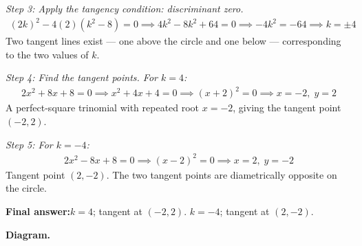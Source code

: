 \documentclass[11pt]{article}
\begin{document}
\textit{Step 3: Apply the tangency condition: discriminant zero.}
\[\begin{gathered}
(2k)^2 - 4(2)(k^2 - 8) = 0 \implies 4k^2 - 8k^2 + 64 = 0 \implies -4k^2 = -64 \implies k = \pm 4
\end{gathered}\]
Two tangent lines exist --- one above the circle and one below --- corresponding to the two values of \( k \).

\textit{Step 4: Find the tangent points. For \( k = 4 \):}
\[\begin{gathered}
2x^2 + 8x + 8 = 0 \implies x^2 + 4x + 4 = 0 \implies (x + 2)^2 = 0 \implies x = -2, \; y = 2
\end{gathered}\]
A perfect-square trinomial with repeated root \( x = -2 \), giving the tangent point \( (-2, 2) \).

\textit{Step 5: For \( k = -4 \):}
\[\begin{gathered}
2x^2 - 8x + 8 = 0 \implies (x - 2)^2 = 0 \implies x = 2, \; y = -2
\end{gathered}\]
Tangent point \( (2, -2) \). The two tangent points are diametrically opposite on the circle.

\begin{answerbox}
\textbf{Final answer:}\quad \(\displaystyle k = 4\); tangent at \(\displaystyle (-2, 2)\). \(\displaystyle k = -4\); tangent at \(\displaystyle (2, -2)\).
\end{answerbox}
\textbf{Diagram.}
\end{document}
